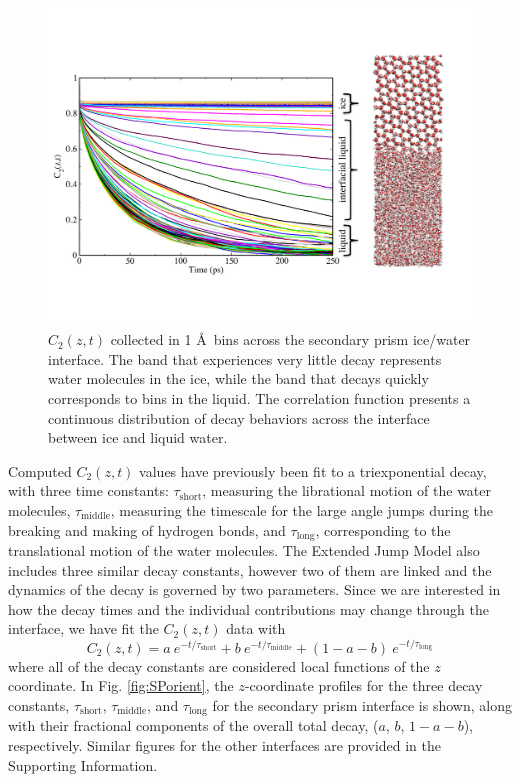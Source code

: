 \begin{figure}
\includegraphics[width=\linewidth]{Figures/CztImage}
\caption{\label{fig:Czt} $C_2(z,t)$ collected in 1 \AA~bins across the
  secondary prism ice/water interface. The band that experiences very
  little decay represents water molecules in the ice, while the band
  that decays quickly corresponds to bins in the liquid.  The
  correlation function presents a continuous distribution of decay
  behaviors across the interface between ice and liquid water.}
\end{figure}

Computed $C_2(z,t)$ values have previously been fit to a
triexponential decay, with three time constants:
$\tau_\mathrm{short}$, measuring the librational motion of the water
molecules, $\tau_\mathrm{middle}$, measuring the timescale for the
large angle jumps during the breaking and making of hydrogen bonds,
and $\tau_\mathrm{long}$, corresponding to the translational motion of
the water molecules.\cite{Louden2013} The Extended Jump Model also
includes three similar decay constants, however two of them are linked
and the dynamics of the decay is governed by two parameters. Since we
are interested in how the decay times and the individual contributions
may change through the interface, we have fit the $C_2(z,t)$ data
with
\begin{equation}
  C_{2}(z,t) = a~e^{-t/\tau_\mathrm{short}} + b~e^{-t/\tau_\mathrm{middle}} + 
  (1-a-b)~e^{-t/\tau_\mathrm{long}}
\label{eq:c2}
\end{equation}
where all of the decay constants are considered local functions of the
$z$ coordinate. In Fig. \ref{fig:SPorient}, the $z$-coordinate
profiles for the three decay constants, $\tau_{\mathrm{short}}$,
$\tau_{\mathrm{middle}}$, and $\tau_{\mathrm{long}}$ for the secondary prism interface
is shown, along with their fractional components of the overall total
decay, ($a$, $b$, $1-a-b$), respectively. Similar figures for the
other interfaces are provided in the Supporting Information.

